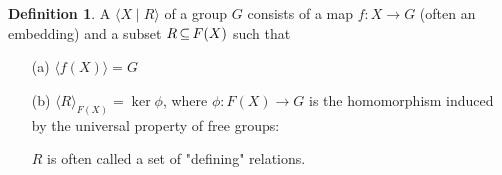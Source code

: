 \documentclass[11pt]{book}
\theoremstyle{definition}   \newtheorem{defn}[counter]{Definition} %
\newcommand{\gen}[1]{\langle #1 \rangle}   \newcommand{\stab}[2]{\tn{Stab}_{#1}(#2)}   \newcommand{\fix}[2]{\tn{Fix}_{#1}(#2)}
\DeclareMathOperator{\ra}{\rightarrow}   \DeclareMathOperator{\Poly}{\mathbf{P}}   \DeclareMathOperator{\spn}{\textnormal{span}}   \DeclareMathOperator{\aut}{\textnormal{Aut}}
\newcommand{\vs}{\vspace{8pt}}
\numberwithin{counter}{chapter}
\begin{document}
\vs

\begin{defn}
A  $\gen{X \mid R}$ of a group $G$ consists of a map $f : X \ra G$ (often an embedding) and a subset $R \operatorname{\subseteq} F(X)$ such that
	\begin{enumerate}
	\item[(a)] $\gen{f(X)} = G$
	\item[(b)] $\gen{R}_{F(X)} = \ker \phi$, where $\phi : F(X) \ra G$ is the homomorphism induced by the universal property of free groups:
	 $R$ is often called a set of "defining" relations.
	\end{enumerate}
\end{defn}

\vs
\end{document}
